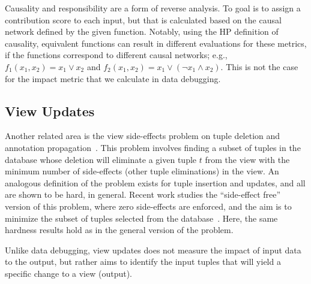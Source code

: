 Causality and responsibility are a form of reverse analysis. To goal
is to assign a contribution score to each input, but that is
calculated based on the causal network defined by the given
function. Notably, using the HP definition of causality, equivalent
functions can result in different evaluations for these metrics, if
the functions correspond to different causal networks; e.g.,
$f_1(x_1,x_2) = x_1\vee x_2$ and $f_2(x_1,x_2) = x_1\vee (\neg
x_1\wedge x_2)$. This is not the case for the impact metric that we
calculate in data debugging.



\subsection*{View Updates}
Another related area is the view side-effects problem on
tuple deletion and annotation
propagation~\cite{DBLP:conf/pods/BunemanKT02}. This problem involves
finding a subset of tuples in the database whose deletion will
eliminate a given tuple $t$ from the view with the minimum number of
side-effects (other tuple eliminations) in the view. An analogous
definition of the problem exists for tuple insertion and updates, and
all are shown to be hard, in general. Recent work
studies the ``side-effect free'' version of this problem, where zero
side-effects are enforced, and the aim is to minimize the subset of
tuples selected from the database~\cite{cong2010}. Here, the same hardness results
hold as in the general version of the problem.

Unlike data debugging, view updates does not measure the impact of input data
to the output, but rather aims to identify the input tuples that will
yield a specific change to a view (output).

